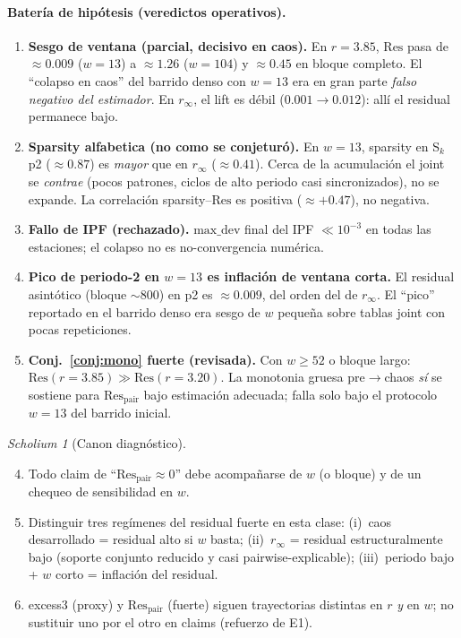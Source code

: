 \documentclass[11pt,a4paper]{article}
\theoremstyle{definition}
\theoremstyle{plain}
\theoremstyle{remark}
\newtheorem{scholium}{Scholium}[section]
\newcommand{\Res}{\mathrm{Res}}
\begin{document}
\paragraph{Bater\'ia de hip\'otesis (veredictos operativos).}
\begin{enumerate}[label=\textbf{H\arabic*.}]
  \item \textbf{Sesgo de ventana (parcial, decisivo en caos).}
  En $r=3.85$, $\Res$ pasa de $\approx 0.009$ ($w{=}13$) a
  $\approx 1.26$ ($w{=}104$) y $\approx 0.45$ en bloque completo.
  El ``colapso en caos'' del barrido denso con $w{=}13$ era en gran
  parte \emph{falso negativo del estimador}. En $r_\infty$, el lift
  es d\'ebil ($0.001\to 0.012$): all\'i el residual permanece bajo.
  \item \textbf{Sparsity alfabetica (no como se conjetur\'o).}
  En $w{=}13$, sparsity en S$_k$ p2 ($\approx 0.87$) es \emph{mayor}
  que en $r_\infty$ ($\approx 0.41$). Cerca de la acumulaci\'on el
  joint se \emph{contrae} (pocos patrones, ciclos de alto periodo
  casi sincronizados), no se expande. La correlaci\'on
  sparsity--$\Res$ es positiva ($\approx +0.47$), no negativa.
  \item \textbf{Fallo de IPF (rechazado).}
  $\mathrm{max\_dev}$ final del IPF $\ll 10^{-3}$ en todas las
  estaciones; el colapso no es no-convergencia num\'erica.
  \item \textbf{Pico de periodo-2 en $w{=}13$ es inflaci\'on de
  ventana corta.} El residual asint\'otico (bloque $\sim 800$) en
  p2 es $\approx 0.009$, del orden del de $r_\infty$. El ``pico''
  reportado en el barrido denso era sesgo de $w$ peque\~na sobre
  tablas joint con pocas repeticiones.
  \item \textbf{Conj.~\ref{conj:mono} fuerte (revisada).}
  Con $w\ge 52$ o bloque largo: $\Res(r{=}3.85)\gg\Res(r{=}3.20)$.
  La monotonia gruesa pre$\to$chaos \emph{s\'i} se sostiene para
  $\Res_{\mathrm{pair}}$ bajo estimaci\'on adecuada; falla solo
  bajo el protocolo $w{=}13$ del barrido inicial.
\end{enumerate}

\begin{scholium}[Canon diagn\'ostico]
\label{sch:resdiag}
\begin{enumerate}[label=\textbf{E\arabic*.}]
  \setcounter{enumi}{3}
  \item Todo claim de ``$\Res_{\mathrm{pair}}\approx 0$'' debe
  acompa\~narse de $w$ (o bloque) y de un chequeo de sensibilidad
  en $w$.
  \item Distinguir tres reg\'imenes del residual fuerte en esta
  clase: (i)~caos desarrollado = residual alto si $w$ basta;
  (ii)~$r_\infty$ = residual estructuralmente bajo (soporte
  conjunto reducido y casi pairwise-explicable);
  (iii)~periodo bajo + $w$ corto = inflaci\'on del residual.
  \item excess3 (proxy) y $\Res_{\mathrm{pair}}$ (fuerte) siguen
  trayectorias distintas en $r$ \emph{y} en $w$; no sustituir uno
  por el otro en claims (refuerzo de E1).
\end{enumerate}
\end{scholium}
\end{document}
